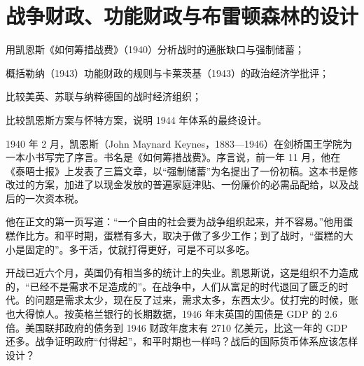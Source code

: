 \chapter{战争财政、功能财政与布雷顿森林的设计}\label{ch:warfinance}

\begin{chapterguide}
\begin{guidegoals}
\item 用凯恩斯《如何筹措战费》（1940）分析战时的通胀缺口与强制储蓄；
\item 概括勒纳（1943）功能财政的规则与卡莱茨基（1943）的政治经济学批评；
\item 比较美英、苏联与纳粹德国的战时经济组织；
\item 比较凯恩斯方案与怀特方案，说明 1944 年体系的最终设计。
\end{guidegoals}
\end{chapterguide}

1940 年 2 月，凯恩斯（John Maynard Keynes，1883—1946）在剑桥国王学院为一本小书写完了序言\cite{keynes1940,loc32}。书名是《如何筹措战费》。序言说，前一年 11 月，他在《泰晤士报》上发表了三篇文章，以“强制储蓄”为名提出了一份初稿\cite{keynes1940}。这本书是修改过的方案，加进了以现金发放的普遍家庭津贴、一份廉价的必需品配给，以及战后的一次资本税\cite{keynes1940}。

他在正文的第一页写道：“一个自由的社会要为战争组织起来，并不容易。”\cite{keynes1940}他用蛋糕作比方。和平时期，蛋糕有多大，取决于做了多少工作；到了战时，“蛋糕的大小是固定的”\cite{keynes1940}。多干活，仗就打得更好，可是不可以多吃\cite{keynes1940}。

开战已近六个月，英国仍有相当多的统计上的失业。凯恩斯说，这是组织不力造成的，“已经不是需求不足造成的”\cite{keynes1940}。在战争中，人们从富足的时代退回了匮乏的时代\cite{keynes1940}。的问题是需求太少，现在反了过来，需求太多，东西太少。仗打完的时候，账也大得惊人。按英格兰银行的长期数据，1946 年末英国的国债是 GDP 的 2.6 倍\cite{boe2017}。美国联邦政府的债务到 1946 财政年度末有 2710 亿美元，比这一年的 GDP 还多\cite{census1975y34,bea2026}。战争证明政府“付得起”，和平时期也一样吗？战后的国际货币体系应该怎样设计？

